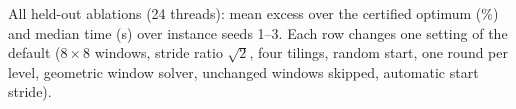 \begin{table}[tbp]
\centering\scriptsize
\caption{All held-out ablations (24 threads): mean excess over the certified optimum (\%) and
median time (s) over instance seeds 1--3. Each row changes one setting of the default
($8\times8$ windows, stride ratio $\sqrt2$, four tilings, random start, one round per level,
geometric window solver, unchanged windows skipped, automatic start stride).}
\label{tab:ablation}
\resizebox{\linewidth}{!}{}
\end{table}

